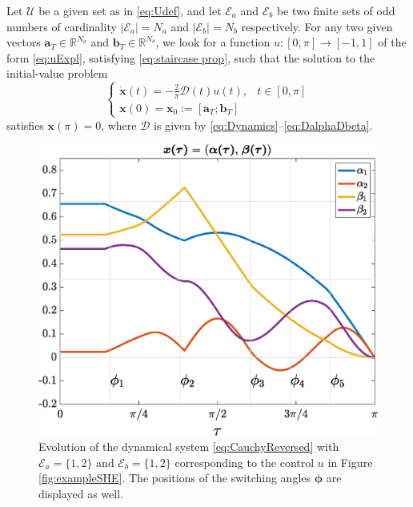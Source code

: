 \documentclass[twocolumn]{autart}    %
\begin{document}
\medskip

\begin{problem}\label{pb:SHEpControl}
Let $\mathcal{U}$ be a given set as in \eqref{eq:Udef},  and let $\mathcal{E} _a $ and $\mathcal{E} _b $ be two finite sets of odd numbers of cardinality $|\mathcal{E}_a| = N_a $ and $ |\mathcal{E} _b| = N_b$ respectively. For any two given vectors $\bm{a}_T \in \mathbb{R}^{N_a}$ and $\bm{b}_T \in \mathbb{R}^{N_b} $,  we look for a function $u: [0,\pi]\to [-1,1]$ of the form \eqref{eq:uExpl}, satisfying \eqref{eq:staircase prop}, such that the solution to the initial-value problem
\begin{equation}\label{eq:CauchyReversed}
	\begin{cases}
        \displaystyle\dot{\bm{x}}(t) = -\frac 2\pi\bm{\mathcal{D}}(t)u(t),  & t \in [0,\pi]
        \\[5pt]
        \bm{x}(0) = \bm{x}_0 := [\bm{a}_T; \bm{b}_T]
    \end{cases}
\end{equation}
satisfies $\bm{x} (\pi) = 0$, where $\bm{\mathcal{D}}$ is given by \eqref{eq:Dynamics}--\eqref{eq:DalphaDbeta}.
\end{problem}

\begin{figure}[ht!] 
    \centering
    \includegraphics[scale=0.325]{img/fig02.eps}
    \caption{Evolution of the dynamical system \eqref{eq:CauchyReversed} with $\mathcal{E}_a = \{1,2\}$ and $\mathcal{E}_b = \{1,2\}$ corresponding to the control $u$ in Figure \ref{fig:exampleSHE}. The positions of the switching angles $\bm{\phi}$ are displayed as well.}\label{fig:evolution_x}
\end{figure}
\end{document}
